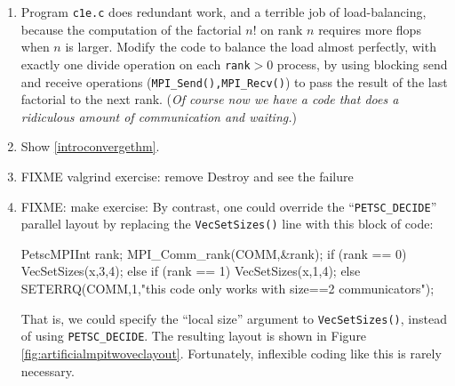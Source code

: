 \renewcommand{\labelenumi}{\arabic{chapter}.\arabic{enumi}\quad}
\begin{enumerate}
\item Program \texttt{c1e.c} does redundant work, and a terrible job of load-balancing, because the computation of the factorial $n!$ on rank $n$ requires more flops when $n$ is larger.  Modify the code to balance the load almost perfectly, with exactly one divide operation on each \texttt{rank}$>0$ process, by using blocking send and receive operations (\texttt{MPI\_Send(),MPI\_Recv()}) to pass the result of the last factorial to the next rank.  (\emph{Of course now we have a code that does a ridiculous amount of communication and waiting.})
\item Show \eqref{introconvergethm}.
\item FIXME valgrind exercise: remove Destroy and see the failure
\item FIXME: make exercise: By contrast, one could override the ``\texttt{PETSC\_DECIDE}'' parallel layout by replacing the \texttt{VecSetSizes()} line with this block of code:
\begin{code}
PetscMPIInt rank;
MPI_Comm_rank(COMM,&rank);
if (rank == 0) {
  VecSetSizes(x,3,4);
} else if (rank == 1) {
  VecSetSizes(x,1,4);
} else {
  SETERRQ(COMM,1,"this code only works with size==2 communicators");
}
\end{code}
That is, we could specify the ``local size'' argument to \texttt{VecSetSizes()}, instead of using \texttt{PETSC\_DECIDE}.  The resulting layout is shown in Figure \ref{fig:artificialmpitwoveclayout}.  Fortunately, inflexible coding like this is rarely necessary.
\end{enumerate}